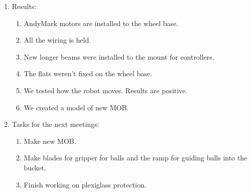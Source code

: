 \begin{enumerate}
	\item Results:
	\begin{enumerate}
		
		\item AndyMark motors are installed to the wheel base.
		
		\item All the wiring is held.
		
		\item New longer beams were installed to the mount for controllers.
		
		\item The flats weren't fixed on the wheel base.
		
		\item We tested how the robot moves. Results are positive.
		
		\item We created a model of new MOB.
		
	\end{enumerate}
	
	\item Tasks for the next meetings:
	\begin{enumerate}
		
		\item Make new MOB.
		
		\item Make blades for gripper for balls and the ramp for guiding balls into the bucket.
		
		\item Finish working on plexiglass protection.
			
	\end{enumerate}
\end{enumerate}
\fillpage
